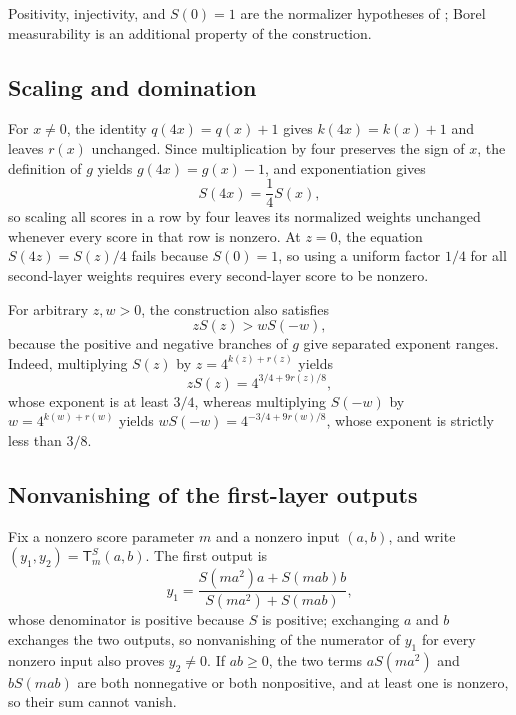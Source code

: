 \documentclass[mlmain]{jmlr}
\newcommand{\T}{\mathsf{T}}
\begin{document}
Positivity, injectivity, and $S(0)=1$ are the normalizer hypotheses of
\citet[Section~3.4]{henry2025}; Borel measurability is an additional
property of the construction.

\subsection{Scaling and domination}

For $x\ne0$, the identity $q(4x)=q(x)+1$ gives $k(4x)=k(x)+1$ and
leaves $r(x)$ unchanged.  Since multiplication by four preserves the sign
of $x$, the definition of $g$ yields $g(4x)=g(x)-1$, and exponentiation
gives
\begin{equation}
 S(4x)=\frac14S(x),
 \label{eq:four-scaling-app}
\end{equation}
so scaling all scores in a row by four leaves its normalized weights
unchanged whenever every score in that row is nonzero.  At $z=0$, the
equation $S(4z)=S(z)/4$ fails because $S(0)=1$, so using a uniform
factor $1/4$ for all second-layer weights requires every second-layer
score to be nonzero.

For arbitrary $z,w>0$, the construction also satisfies
\begin{equation}
 zS(z)>wS(-w),
 \label{eq:mass-dominance}
\end{equation}
because the positive and negative branches of $g$ give separated
exponent ranges.  Indeed, multiplying $S(z)$ by $z=4^{k(z)+r(z)}$ yields
\begin{equation}
 zS(z)=4^{3/4+9r(z)/8},
 \label{eq:mass-identities}
\end{equation}
whose exponent is at least $3/4$, whereas multiplying $S(-w)$ by
$w=4^{k(w)+r(w)}$ yields $wS(-w)=4^{-3/4+9r(w)/8}$, whose exponent is
strictly less than $3/8$.

\subsection{Nonvanishing of the first-layer outputs}

Fix a nonzero score parameter $m$ and a nonzero input $(a,b)$, and write
$(y_1,y_2)=\T_m^S(a,b)$.  The first output is
\begin{equation}
 y_1=
 \frac{S(ma^2)a+S(mab)b}
      {S(ma^2)+S(mab)},
 \label{eq:scalar-outputs}
\end{equation}
whose denominator is positive because $S$ is positive; exchanging $a$
and $b$ exchanges the two outputs, so nonvanishing of the numerator of
$y_1$ for every nonzero input also proves $y_2\ne0$.  If $ab\ge0$, the
two terms $aS(ma^2)$ and $bS(mab)$ are both nonnegative or both
nonpositive, and at least one is nonzero, so their sum cannot vanish.
\end{document}
